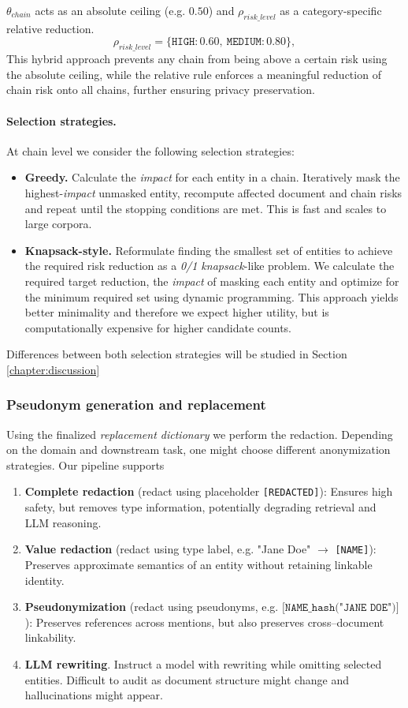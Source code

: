 $\theta_{chain}$ acts as an absolute ceiling (e.g. $0.50$) and $\rho_{risk\_level}$ as a category-specific relative reduction.
\[
\rho_{risk\_level} = \{\texttt{HIGH}:0.60,\ \texttt{MEDIUM}:0.80\},
\]
This hybrid approach prevents any chain from being above a certain risk using the absolute ceiling, while the relative rule enforces a meaningful reduction of chain risk onto all chains, further ensuring privacy preservation.

\paragraph{Selection strategies.}
At chain level we consider the following selection strategies:
\begin{itemize}
  \item \textbf{Greedy.} Calculate the \textit{impact} for each entity in a chain. Iteratively mask the highest-\textit{impact} unmasked entity, recompute affected document and chain risks and repeat until the stopping conditions are met. This is fast and scales to large corpora.
  \item \textbf{Knapsack-style.} Reformulate finding the smallest set of entities to achieve the required risk reduction as a \textit{0/1 knapsack}-like problem. We calculate the required target reduction, the \textit{impact} of masking each entity and optimize for the minimum required set using dynamic programming. This approach yields better minimality and therefore we expect higher utility, but is computationally expensive for higher candidate counts.
\end{itemize}
Differences between both selection strategies will be studied in Section \ref{chapter:discussion} %

\subsubsection{Pseudonym generation and replacement}
Using the finalized \textit{replacement dictionary} we perform the redaction. Depending on the domain and downstream task, one might choose different anonymization strategies. Our pipeline supports 
\begin{enumerate}
  \item \textbf{Complete redaction} (redact using placeholder \texttt{[REDACTED]}): Ensures high safety, but removes type information, potentially degrading retrieval and LLM reasoning.
  \item \textbf{Value redaction} (redact using type label, e.g. "Jane Doe" $\rightarrow$ \texttt{[NAME]}): Preserves approximate semantics of an entity without retaining linkable identity.
  \item \textbf{Pseudonymization} (redact using pseudonyms, e.g. $\texttt{[NAME\_{hash}("JANE DOE")]}$): Preserves references across mentions, but also preserves cross–document linkability. 
  \item \textbf{LLM rewriting}. Instruct a model with rewriting while omitting selected entities. Difficult to audit as document structure might change and hallucinations might appear.  
\end{enumerate}

